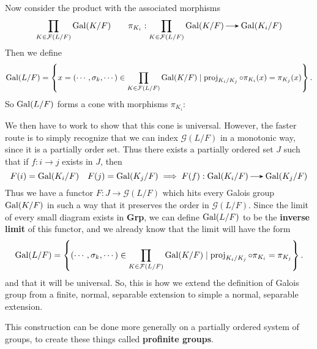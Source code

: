 \begin{example}
        Now consider the product with the associated morphisms
        \[  
            \prod_{K \in\mathcal{F}(L/F)}\gal(K/F)
            \qquad 
            \pi_{K_i}: \prod_{K \in\mathcal{F}(L/F)}\gal(K/F) 
            \to \gal(K_i/F)
        \]
        Then we define
        \[
            \operatorname{\mathrm{Gal}}(L/F)
            =
            \left\{ x = (\cdots, \sigma_k, \cdots) \in \prod_{K \in \mathcal{F}(L/F)}\operatorname{\mathrm{Gal}}(K/F) 
            \mid \operatorname{\mathrm{proj}}_{K_i/K_j} \circ \pi_{K_i}(x) = \pi_{K_j}(x) \right\}.
        \]
        So $\operatorname{\mathrm{Gal}}(L/F)$ forms a cone with morphisms $\pi_{K_i}$:
        \begin{center}
        \end{center}
        We then have to work to show that this cone is universal.
        However, the faster route is to simply recognize that we can 
        index $\mathcal{G}(L/F)$ in a monotonic way, since it is a partially order set.
        Thus there exists a partially ordered set $J$ such that 
        if $f: i \to j$ exists in $J$, then 
        \[
            F(i)= \gal(K_i/F) \quad F(j) = \gal(K_j/F) 
            \implies 
            F(f): \gal(K_i/F) \to \gal(K_j/F)  
        \]
        Thus we have a functor $F: J \to \mathcal{G}(L/F)$ which hits every 
        Galois group $\operatorname{\mathrm{Gal}}(K/F)$ in such
        a way that it preserves the order in $\mathcal{G}(L/F)$. Since
        the limit of every small diagram exists in \textbf{Grp},
        we can define $\operatorname{\mathrm{Gal}}(L/F)$ to be the \textbf{inverse limit} of this
        functor, and we already know that the limit will have the form
        \[
            \operatorname{\mathrm{Gal}}(L/F)
            =
            \left\{ (\cdots, \sigma_k, \cdots) \in \prod_{K \in \mathcal{F}(L/F)}\operatorname{\mathrm{Gal}}(K/F) \mid \operatorname{\mathrm{proj}}_{K_i/K_j} \circ \pi_{K_i} = \pi_{K_j} \right\}.
        \]
        and that it will be universal. So, this is how we extend the
        definition of Galois group from a finite, normal, separable
        extension to simple a normal, separable extension.
    \end{example}

    \noindent This construction can be done more generally on a partially
    ordered system of groups, to create these things called 
    \textbf{profinite groups}. 

